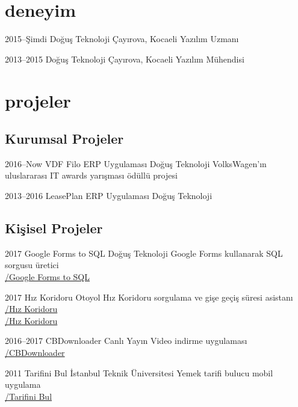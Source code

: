 \documentclass[]{../friggeri-cv} %
\begin{document}
\section{deneyim}

\begin{entrylist}

\entry
{2015--Şimdi}
{Doğuş Teknoloji}
{Çayırova, Kocaeli}
{Yazılım Uzmanı}

\entry
{2013--2015}
{Doğuş Teknoloji}
{Çayırova, Kocaeli}
{Yazılım Mühendisi}

\end{entrylist}

\section{projeler}

\subsection{Kurumsal Projeler}

\begin{entrylist}

\entry
{2016--Now}
{VDF Filo ERP Uygulaması}
{Doğuş Teknoloji}
{VolksWagen'ın uluslararası IT awards yarışması ödüllü projesi}

\entry
{2013--2016}
{LeasePlan ERP Uygulaması}
{Doğuş Teknoloji}
{}

\end{entrylist}

\subsection{Kişisel Projeler}

\begin{entrylist}

\entry
{2017}
{Google Forms to SQL}
{Doğuş Teknoloji}
{Google Forms kullanarak SQL sorgusu üretici
\\\href{https://github.com/suphero/Google-Forms-to-SQL}{\faGithub/Google Forms to SQL}}

\entry
{2017}
{Hız Koridoru}
{}
{Otoyol Hız Koridoru sorgulama ve gişe geçiş süresi asistanı
\\\href{https://play.google.com/store/apps/details?id=com.harunsokullu.speedcorridor}{\faAndroid/Hız Koridoru}
\\\href{https://itunes.apple.com/tr/app/h\%C4\%B1z-koridoru/id1265151812}{\faApple/Hız Koridoru}}

\entry
{2016--2017}
{CBDownloader}
{}
{Canlı Yayın Video indirme uygulaması
\\\href{https://github.com/suphero/CBDownloader}{\faGithub/CBDownloader}}

\entry
{2011}
{Tarifini Bul}
{İstanbul Teknik Üniversitesi}
{Yemek tarifi bulucu mobil uygulama
\\\href{https://play.google.com/store/apps/details?id=com.tarifinibul}{\faAndroid/Tarifini Bul}}

\end{entrylist}

\footer
\end{document}
